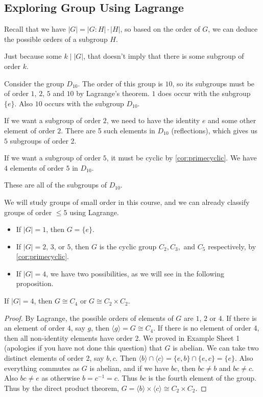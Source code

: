 \documentclass[a4paper]{scrartcl}
\newcommand{\newsection}{\subsection}
\begin{document}
\newsection{Exploring Group Using Lagrange}

Recall that we have $|G| = |G:H| \cdot |H|$, so based on the order of $G$, we can deduce the possible orders of a subgroup $H$.

\begin{remark}
	Just because some $k \mid |G|$, that doesn't imply that there is some subgroup of order $k$.
\end{remark}

\begin{example}[Subgroups of $D_{10}$]
	Consider the group $D_{10}$. The order of this group is $10$, so its subgroups must be of order $1$, $2$, $5$ and $10$ by Lagrange's theorem.
	$1$ does occur with the subgroup $\{e\}$. Also $10$ occurs with the subgroup $D_{10}$.

	If we want a subgroup of order $2$, we need to have the identity $e$ and some other element of order $2$. There are 5 such elements in $D_{10}$ (reflections), which gives us $5$ subgroups of order 2.

	If we want a subgroup of order $5$, it must be cyclic by \autoref{cor:primecyclic}. We have $4$ elements of order $5$ in $D_{10}$.

	These are all of the subgroups of $D_{10}$.
\end{example}

We will study groups of small order in this course, and we can already classify groups of order $\leq 5$ using Lagrange.

\begin{itemize}
	\item If $|G| = 1$, then $G = \{e\}$.
	\item If $|G| = 2$, $3$, or $5$, then $G$ is the cyclic group $C_2, C_3,$ and $C_5$ respectively, by \autoref{cor:primecyclic}.
	\item If $|G| = 4$, we have two possibilities, as we will see in the following proposition.
\end{itemize}

\begin{proposition}
	If $|G| = 4$, then $G \cong C_4$ or $G \cong C_2 \times C_2$.
\end{proposition}
\begin{proof}
	By Lagrange, the possible orders of elements of $G$ are $1$, $2$ or $4$. If there is an element of order $4$, say $g$, then $\langle g \rangle = G \cong C_4$. If there is no element of order 4, then all non-identity elements have order 2. We proved in Example Sheet 1 (apologies if you have not done this question) that $G$ is abelian. We can take two distinct elements of order 2, say $b, c$. Then $\langle b \rangle \cap \langle c \rangle = \{e, b\} \cap \{e, c\} = \{e\}$. Also everything commutes as $G$ is abelian, and if we have $bc$, then $bc \neq b$ and $bc \neq c$. Also $bc \neq e$ as otherwise $b = c^{-1} = c$. Thus $bc$ is the fourth element of the group. Thus by the direct product theorem, $G = \langle b \rangle \times \langle c \rangle \cong C_2 \times C_2$.
\end{proof}
\end{document}
